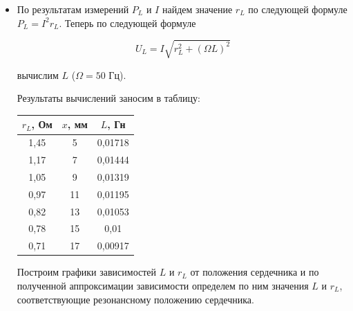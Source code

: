 \documentclass[a4paper, 12pt]{article}%
\begin{document}
\begin{itemize}

\item По результатам измерений $P_L$ и $I$ найдем значение $r_L$ по следующей формуле $P_L = I^2r_L $. Теперь по следующей формуле 

\begin{equation}
U_L = I \sqrt{r_L^2 + (\Omega L)^2}
\end{equation}

вычислим $L$ ($\Omega = 50$ Гц).

Результаты вычислений заносим в таблицу:


\begin{table}[!h]
\begin{center}
\begin{tabular}{|c|c|c|}
\hline $r_L$, Ом & $x$, мм & $L$, Гн\\
\hline 1,45 & 5 & 0,01718 \\
\hline 1,17 & 7 & 0,01444 \\
\hline 1,05 & 9 & 0,01319 \\
\hline 0,97 & 11 & 0,01195 \\
\hline 0,82 & 13 & 0,01053 \\
\hline 0,78 & 15 & 0,01 \\
\hline 0,71 & 17 & 0,00917 \\
\hline
\end{tabular}
\end{center} 
\end{table}


Построим графики зависимостей $L$ и $r_L$ от положения сердечника и по полученной аппроксимации зависимости определем по ним значения $L$ и $r_L$, соответствующие резонансному положению сердечника.


\begin{center}

\begin{figure}[!h]
\end{figure}


\end{center}
\end{itemize}
\end{document}
